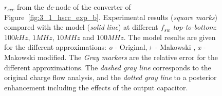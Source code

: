 \begin{figure}[!h]
\centering
    \begin{subfigure}{\textwidth}
        \parbox[c]{.03\linewidth}{\subcaption{}\label{fig:exp_rscc_dc_node_100kHz}}
        \hspace{.02\linewidth}
        \parbox[c]{.95\linewidth}{
        \centering
        }
    \end{subfigure}

    \begin{subfigure}{\textwidth}
        \parbox[c]{.03\linewidth}{\subcaption{}\label{fig:exp_rscc_dc_node_1MHz}}
        \hspace{.02\linewidth}
        \parbox[c]{.95\linewidth}{
        \centering
        }
    \end{subfigure}

    \begin{subfigure}{\textwidth}
        \parbox[c]{.03\linewidth}{\subcaption{}\label{fig:exp_rscc_dc_node_10MHz}}
        \hspace{.02\linewidth}
        \parbox[c]{.95\linewidth}{
        \centering
        }
    \end{subfigure}

    \begin{subfigure}{\textwidth}
        \parbox[c]{.03\linewidth}{\subcaption{}\label{fig:exp_rscc_dc_node_100MHz}}
        \hspace{.02\linewidth}
        \parbox[c]{.95\linewidth}{
        \centering
        }
    \end{subfigure}

\caption{$r_{scc}$ from the \emph{dc}-node of the converter of Figure~\ref{fig:3_1_hscc_exp_b}. Experimental results (\emph{square marks}) compared with the model (\emph{solid line}) at different $f_{sw}$ \emph{top-to-bottom}: $100kHz$, $1MHz$, $10MHz$ and $100MHz$. The model results are given for the different approximations: \emph{o} - Original,\emph{+} - Makowski , \emph{x} - Makowski modified. The \emph{Gray markers} are the relative error for the different approximations.  The \emph{dashed gray line} corresponds to the original charge flow analysis, and the \emph{dotted gray line} to a posterior enhancement including the effects of the output capacitor.}
\label{fig:exp_rscc_dc_node_dx}
\end{figure}


